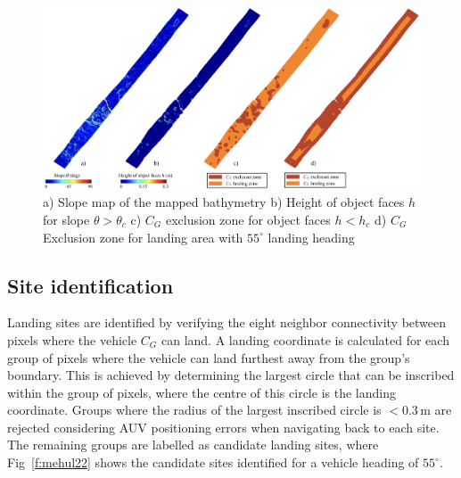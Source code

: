 
\begin{figure}[!ht]
\centering
\includegraphics[width=6.5in]{./images/mehul20_21.png}
\caption{a) Slope map of the mapped bathymetry b) Height of object faces $h$ for slope $\theta > \theta_c$ c) $C_G$ exclusion zone for object faces $h < h_c$ d)  $C_G$ Exclusion zone for landing area with $55^\circ$ landing heading}
\label{f:mehul20_21}
\end{figure}
 
\subsection{Site identification}

Landing sites are identified by verifying the eight neighbor connectivity between pixels where the vehicle $C_G$ can land. A landing coordinate is calculated for each group of pixels where the vehicle can land furthest away from the group's boundary. This is achieved by determining the largest circle that can be inscribed within the group of pixels, where the centre of this circle is the landing coordinate. Groups where the radius of the largest inscribed circle is $<0.3$\,m are rejected considering AUV positioning errors when navigating back to each site. The remaining groups are labelled as candidate landing sites, where Fig~\ref{f:mehul22} shows the candidate sites identified for a vehicle heading of $55^\circ$.


